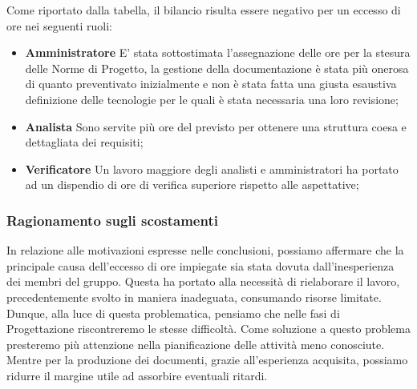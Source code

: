 Come riportato dalla tabella, il bilancio risulta essere negativo per un eccesso di ore nei seguenti ruoli:
\begin{itemize}
	\item \textbf{Amministratore} E' stata sottostimata l'assegnazione delle ore per la stesura delle Norme di Progetto, la gestione della documentazione è stata più onerosa di quanto preventivato inizialmente e non è stata fatta una giusta esaustiva definizione delle tecnologie per le quali è stata necessaria una loro revisione;
	\item \textbf{Analista} Sono servite più ore del previsto per ottenere una struttura coesa e dettagliata dei requisiti;
	\item \textbf{Verificatore} Un lavoro maggiore degli analisti e amministratori ha portato ad un dispendio di ore di verifica superiore rispetto alle aspettative;
\end{itemize}

\subsubsection{Ragionamento sugli scostamenti}
In relazione alle motivazioni espresse nelle conclusioni, possiamo affermare che la principale causa dell'eccesso di ore impiegate sia stata dovuta dall'inesperienza dei membri del gruppo. 
Questa ha portato alla necessità di rielaborare il lavoro, precedentemente svolto in maniera inadeguata, consumando risorse limitate.
Dunque, alla luce di questa problematica, pensiamo che nelle fasi di Progettazione riscontreremo le stesse difficoltà. Come soluzione a questo problema presteremo più attenzione nella pianificazione delle attività meno conosciute. Mentre per la produzione dei documenti, grazie all'esperienza acquisita, possiamo ridurre il margine utile ad assorbire eventuali ritardi.


